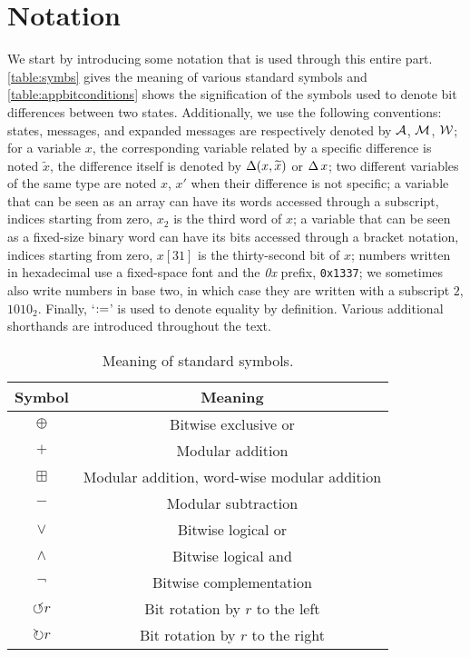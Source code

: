 \section{Notation}
\label{sec:not}

We start by introducing some notation that is used through this entire part.
\autoref{table:symbs} gives the meaning of various standard symbols and \autoref{table:appbitconditions} shows the signification of the symbols used to denote bit differences between two states.
Additionally, we use the following conventions: \shaone states, messages, and expanded messages are respectively denoted by $\mathcal{A}$, $\mathcal{M}$, $\mathcal{W}$; for a variable $x$, the corresponding variable related by a specific
difference is noted $\widetilde{x}$, the difference itself is denoted by $\operatorname{\Delta}(x,\widetilde{x})$ or $\operatorname{\Delta} x$; two different variables of the same type are noted $x$, $x'$ when their difference is not specific;
a variable that can be seen as an array can have its words accessed through a subscript, indices starting from zero, \eg $x_2$ is the third word of $x$; a variable that can be seen as a fixed-size binary word
can have its bits accessed through a bracket notation, indices starting from zero, \eg $x[31]$ is the thirty-second bit of $x$; 
numbers written in hexadecimal use a fixed-space font and the \emph{0x} prefix, \eg \texttt{0x1337}; we sometimes also write numbers in base two, in which case they are written with a subscript $2$, \eg $1010_2$. Finally, `$:=$' is used to denote equality by definition.
Various additional shorthands are introduced throughout the text.

\begin{table}[!htb]
\caption{Meaning of standard symbols.}\label{table:symbs}
\begin{center}
\begin{tabular}{c c}
\toprule
Symbol & Meaning\\
\midrule
$\oplus$ & Bitwise exclusive or\\
$+$ & Modular addition\\
$\boxplus$ & Modular addition, word-wise modular addition\\
$-$ & Modular subtraction\\
$\vee$ & Bitwise logical or\\
$\wedge$ & Bitwise logical and\\
$\neg$ & Bitwise complementation\\
$\circlearrowleft r$ & Bit rotation by $r$ to the left\\
$\circlearrowright r$ & Bit rotation by $r$ to the right\\
\bottomrule
\end{tabular}
\end{center}
\end{table}

